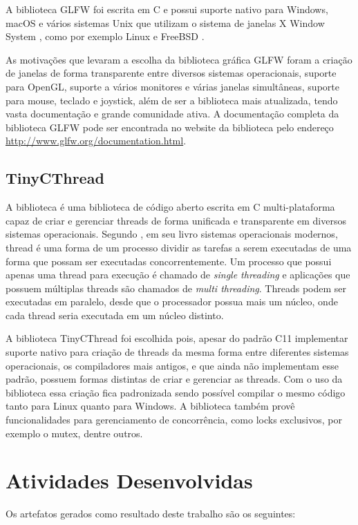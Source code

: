 \documentclass[12pt, %
openright,
oneside, %
a4paper,    %
brazil]{facom-ufu-abntex2}
\begin{document}
A biblioteca GLFW foi escrita em C e possui suporte nativo para Windows, macOS e vários sistemas Unix \cite{Unix:About} que utilizam o sistema de janelas X Window System \cite{X:About}, como por exemplo Linux \cite{Linux:About} e FreeBSD \cite{FreeBSD:About}.

As motivações que levaram a escolha da biblioteca gráfica GLFW foram a criação de janelas de forma transparente entre diversos sistemas operacionais, suporte para OpenGL, suporte a vários monitores e várias janelas simultâneas, suporte para mouse, teclado e joystick, além de ser a biblioteca mais atualizada, tendo vasta documentação e grande comunidade ativa. A documentação completa da biblioteca GLFW pode ser encontrada no website da biblioteca pelo endereço \hyperref[http://www.glfw.org/documentation.html]{http://www.glfw.org/documentation.html}.

\subsection{TinyCThread}
A biblioteca  é uma biblioteca de código aberto escrita em C multi-plataforma capaz de criar e gerenciar threads de forma unificada e transparente em diversos sistemas operacionais. Segundo , em seu livro sistemas operacionais modernos, thread é uma forma de um processo dividir as tarefas a serem executadas de uma forma que possam ser executadas concorrentemente. Um processo que possui apenas uma thread para execução é chamado de \textit{single threading} e aplicações que possuem múltiplas threads são chamados de \textit{multi threading}. Threads podem ser executadas em paralelo, desde que o processador possua mais um núcleo, onde cada thread seria executada em um núcleo distinto.

A biblioteca TinyCThread foi escolhida pois, apesar do padrão C11 implementar suporte nativo para criação de threads da mesma forma entre diferentes sistemas operacionais, os compiladores mais antigos, e que ainda não implementam esse padrão, possuem formas distintas de criar e gerenciar as threads. Com o uso da biblioteca essa criação fica padronizada sendo possível compilar o mesmo código tanto para Linux quanto para Windows. A biblioteca também provê funcionalidades para gerenciamento de concorrência, como locks exclusivos, por exemplo o mutex, dentre outros.

\section{Atividades Desenvolvidas}
Os artefatos gerados como resultado deste trabalho são os seguintes:
\end{document}
